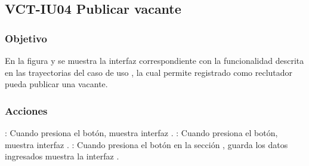 \clearpage
\subsection{VCT-IU04 Publicar vacante}

\subsubsection{Objetivo}
En la figura  y   se muestra la interfaz correspondiente con la funcionalidad descrita en las
trayectorias del caso de uso  , la cual permite registrado como reclutador pueda publicar una vacante.
\subsubsection{Acciones}


\Titem {} : Cuando presiona el botón, muestra interfaz .
\Titem {} : Cuando presiona el botón, muestra interfaz .
\Titem {} : Cuando presiona el botón en la sección  , guarda los datos ingresados muestra la interfaz .

 

\clearpage
